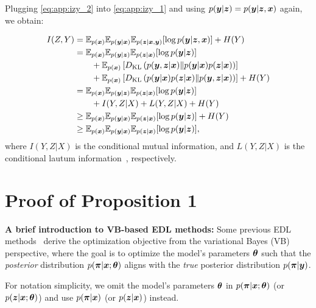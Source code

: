 Plugging \cref{eq:app:izy_2} into \cref{eq:app:izy_1} and using $p(\bm{y}| \bm{z} ) = p(\bm{y} |\bm{z}, \bm{x})$ again, we obtain: 

\begin{equation}
    \begin{aligned}
        I(Z, Y) &= \mathbb{E}_{p(\bm{x})} \mathbb{E}_{p(\bm{y} | \bm{x})} \mathbb{E}_{p(\bm{z} | \bm{x}, \bm{y})} [\log p (\bm{y} | \bm{z}, \bm{x})] + H(Y) \\
        &= \mathbb{E}_{p(\bm{x})} \mathbb{E}_{p(\bm{y} | \bm{z})} \mathbb{E}_{p(\bm{z} | \bm{x})} [\log p(\bm{y} | \bm{z}) ]\\
        & \qquad + \mathbb{E}_{p(\bm{x})}\left[ D_{\text{KL}}\left(p(\bm{y}, \bm{z} | \bm{x}) \| p(\bm{y} | \bm{x}) p(\bm{z}| \bm{x}) \right) \right] \\
        & \qquad + \mathbb{E}_{p(\bm{x})} \left[ D_{\text{KL}}\left(p(\bm{y} | \bm{x}) p(\bm{z} | \bm{x}) \| p(\bm{y}, \bm{z} | \bm{x}) \right) \right] + H(Y) \\
        &= \mathbb{E}_{p(\bm{x})} \mathbb{E}_{p(\bm{y} | \bm{z})} \mathbb{E}_{p(\bm{z} | \bm{x})} [\log p(\bm{y} | \bm{z})]   \\
        & \qquad + I(Y, Z | X) + L(Y, Z | X) + H(Y) \\
        &\geq \mathbb{E}_{p(\bm{x})} \mathbb{E}_{p(\bm{y} | \bm{x})} \mathbb{E}_{p(\bm{z} | \bm{x})} [\log p(\bm{y} | \bm{z})]  + H(Y) \\
        &\geq \mathbb{E}_{p(\bm{x})} \mathbb{E}_{p(\bm{y} | \bm{x})} \mathbb{E}_{p(\bm{z} | \bm{x})} [\log p(\bm{y} | \bm{z})],
    \end{aligned}
\end{equation}
where $I(Y, Z | X)$ is the conditional mutual information, and $L(Y, Z | X)$ is the conditional lautum information~\citep{palomar2008lautum}, respectively.
\newpage
\section{Proof of Proposition 1} \label{sec:app:proof_proposition}

\textbf{A brief introduction to VB-based EDL methods:} Some previous EDL methods~\citep{chen2018variational, joo2020being} derive the optimization objective from the variational Bayes (VB) perspective, where the goal is to optimize the model's parameters $\bm{\theta}$ such that the \emph{posterior} distribution $p(\bm{\pi} | \bm{x}; \bm{\theta})$ aligns with the \emph{true} posterior distribution $p(\bm{\pi} | \bm{y})$.

For notation simplicity, we omit the model's parameters $\bm{\theta}$ in $p(\bm{\pi} | \bm{x}; \bm{\theta})$ (or $p(\bm{z} | \bm{x}; \bm{\theta})$) and use $p(\bm{\pi} | \bm{x})$ (or $p(\bm{z} | \bm{x})$) instead.

